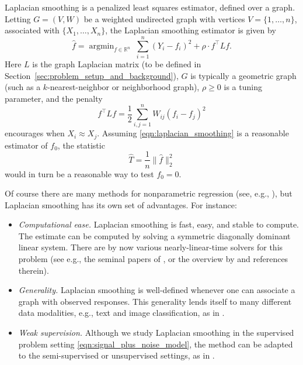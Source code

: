 \documentclass[twoside]{article}
\newcommand{\Reals}{\mathbb{R}}
\newcommand{\1}{\mathbf{1}}
\DeclareMathOperator*{\argmin}{argmin}
\newcommand{\Lap}{L}
\newcommand{\wh}[1]{\widehat{#1}}
\theoremstyle{definition}
\theoremstyle{remark}
\begin{document}
Laplacian smoothing \citep{smola2003} is a penalized least squares estimator, defined over a graph. Letting $G = (V,W)$ be a weighted undirected graph with vertices $V=\{1,\ldots,n\}$, associated with $\{X_1,\ldots,X_n\}$, the Laplacian smoothing estimator \smash{$\wh{f}$} is given by
\begin{equation}
\label{eqn:laplacian_smoothing}
\wh{f} =  \argmin_{f \in \Reals^n} \; \sum_{i = 1}^{n}(Y_i - f_i)^2 + \rho \cdot f^\top \Lap f. 
\end{equation}
Here $\Lap$ is the graph Laplacian matrix (to be defined in Section~\ref{sec:problem_setup_and_background}), $G$ is typically a geometric graph (such as a $k$-nearest-neighbor or neighborhood graph), $\rho \geq 0$ is a tuning parameter, and the penalty
\begin{equation*}
f^\top \Lap f = \frac{1}{2} \sum_{i,j = 1}^{n} W_{ij}(f_i - f_j)^2
\end{equation*}
encourages \smash{$\wh{f}_i \approx \wh{f}_j$} when $X_i \approx X_j$. Assuming \eqref{eqn:laplacian_smoothing} is a reasonable estimator of $f_0$, the statistic
\begin{equation}
\label{eqn:laplacian_smoothing_test}
\wh{T} = \frac{1}{n} \| \wh{f} \|_2^2 
\end{equation}
would in turn be a reasonable way to test $f_0 = 0$. 

Of course there are many methods for nonparametric regression (see, e.g., \citet{gyorfi2006,wasserman2006,tsybakov2008_book}), but Laplacian smoothing has its own set of advantages. For instance:
\begin{itemize}
	\item \emph{Computational ease.} Laplacian smoothing is fast, easy, and stable to compute. The estimate \smash{$\wh{f}$} can be computed by solving a symmetric diagonally dominant linear system. There are by now various nearly-linear-time solvers for this problem (see e.g., the seminal papers of \citet{spielman2011,spielman2013,spielman2014}, or the overview by \citet{vishnoi2012} and references therein).
	\item \emph{Generality.} Laplacian smoothing is well-defined whenever one can associate a graph with observed responses. This generality lends itself to many different data modalities, e.g., text and image classification, as in \citet{kondor2002,belkin03a,belkin2006}.
	\item \emph{Weak supervision.} Although we study Laplacian smoothing in the supervised problem setting \eqref{eqn:signal_plus_noise_model}, the method can be adapted to the semi-supervised or unsupervised settings, as in \citet{zhu2003semisupervised,zhou2005learning,nadler09}. %
\end{itemize}
\end{document}
